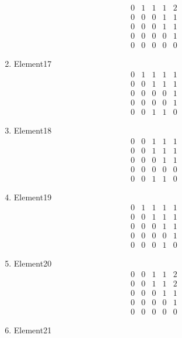 \documentclass[12pt]{article}
\begin{document}
\begin{multicols}{3}
\begin{enumerate}
\begin{equation*}
\begin{array}{ccccc}
0&1&1&1&2\\
0&0&0&1&1\\
0&0&0&1&1\\
0&0&0&0&1\\
0&0&0&0&0
\end{array}
\end{equation*}
\item Element17
\begin{equation*}
\begin{array}{ccccc}
0&1&1&1&1\\
0&0&1&1&1\\
0&0&0&0&1\\
0&0&0&0&1\\
0&0&1&1&0
\end{array}
\end{equation*}
\item Element18
\begin{equation*}
\begin{array}{ccccc}
0&0&1&1&1\\
0&0&1&1&1\\
0&0&0&1&1\\
0&0&0&0&0\\
0&0&1&1&0
\end{array}
\end{equation*}
\item Element19
\begin{equation*}
\begin{array}{ccccc}
0&1&1&1&1\\
0&0&1&1&1\\
0&0&0&1&1\\
0&0&0&0&1\\
0&0&0&1&0
\end{array}
\end{equation*}
\item Element20
\begin{equation*}
\begin{array}{ccccc}
0&0&1&1&2\\
0&0&1&1&2\\
0&0&0&1&1\\
0&0&0&0&1\\
0&0&0&0&0
\end{array}
\end{equation*}
\item Element21
\begin{equation*}
\begin{array}{ccccc}

\end{array}
\end{equation*}
\end{enumerate}
\end{multicols}
\end{document}
